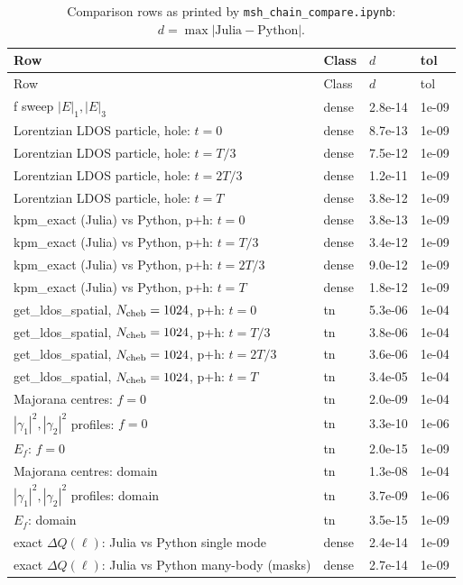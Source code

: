 \documentclass[11pt]{article}
\newcommand{\nb}[1]{\texttt{#1}}
\begin{document}
\begin{longtable}{>{\raggedright}p{7.6cm}lll}
\caption{Comparison rows as printed by \nb{msh\_chain\_compare.ipynb}: $d=\max|\text{Julia}-\text{Python}|$.}\\
\toprule
Row & Class & $d$ & tol \\
\midrule
\endfirsthead
\toprule
Row & Class & $d$ & tol \\
\midrule
\endhead
\bottomrule
\endfoot
f sweep $|E|_1,|E|_3$ & dense & 2.8e-14 & 1e-09\\
Lorentzian LDOS particle, hole: $t=0$ & dense & 8.7e-13 & 1e-09\\
Lorentzian LDOS particle, hole: $t=T/3$ & dense & 7.5e-12 & 1e-09\\
Lorentzian LDOS particle, hole: $t=2T/3$ & dense & 1.2e-11 & 1e-09\\
Lorentzian LDOS particle, hole: $t=T$ & dense & 3.8e-12 & 1e-09\\
\midrule
kpm\_exact (Julia) vs Python, p+h: $t=0$ & dense & 3.8e-13 & 1e-09\\
kpm\_exact (Julia) vs Python, p+h: $t=T/3$ & dense & 3.4e-12 & 1e-09\\
kpm\_exact (Julia) vs Python, p+h: $t=2T/3$ & dense & 9.0e-12 & 1e-09\\
kpm\_exact (Julia) vs Python, p+h: $t=T$ & dense & 1.8e-12 & 1e-09\\
get\_ldos\_spatial, $N_{\rm cheb}=1024$, p+h: $t=0$ & tn & 5.3e-06 & 1e-04\\
get\_ldos\_spatial, $N_{\rm cheb}=1024$, p+h: $t=T/3$ & tn & 3.8e-06 & 1e-04\\
get\_ldos\_spatial, $N_{\rm cheb}=1024$, p+h: $t=2T/3$ & tn & 3.6e-06 & 1e-04\\
get\_ldos\_spatial, $N_{\rm cheb}=1024$, p+h: $t=T$ & tn & 3.4e-05 & 1e-04\\
\midrule
Majorana centres: $f=0$ & tn & 2.0e-09 & 1e-04\\
$|\gamma_1|^2,|\gamma_2|^2$ profiles: $f=0$ & tn & 3.3e-10 & 1e-06\\
$E_f$: $f=0$ & tn & 2.0e-15 & 1e-09\\
Majorana centres: domain & tn & 1.3e-08 & 1e-04\\
$|\gamma_1|^2,|\gamma_2|^2$ profiles: domain & tn & 3.7e-09 & 1e-06\\
$E_f$: domain & tn & 3.5e-15 & 1e-09\\
\midrule
exact $\Delta Q(\ell)$: Julia vs Python single mode & dense & 2.4e-14 & 1e-09\\
exact $\Delta Q(\ell)$: Julia vs Python many-body (masks) & dense & 2.7e-14 & 1e-09\\

\end{longtable}
\end{document}
